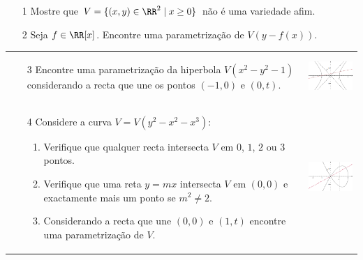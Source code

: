 
\usepackage{hyperref}
\usepackage{graphicx}
\newcommand{\real}[1]{\underline{\mathbf{#1}}} 
\newcommand{\mod}{\mathrm{mod}\:}




\nextsect

\begin{enumerate}
\item[1] Mostre que $V=\{(x,y)\in \RR^2 \mid x \geq 0\}$ não é uma variedade afim.
\item[2] Seja $f\in \RR[x]$. Encontre uma parametrização de $V(y-f(x))$.
\end{enumerate}
\begin{tabular}{lr}
 \begin{minipage}{0.7\textwidth}
  \begin{enumerate}
    \item[3] Encontre uma parametrização da hiperbola $V(x^2-y^2-1)$ considerando a recta que une os pontos $(-1,0)$ e $(0,t)$. 
  \end{enumerate}
\vspace{4cm}
 \end{minipage}
&\includegraphics[width=4cm]{hiperbola.jpg}\\
\begin{minipage}{0.7\textwidth}
 \begin{enumerate}
  \item[4] Considere a curva $V=V(y^2-x^2-x^3)$:
  \begin{enumerate}
	\item Verifique que qualquer recta intersecta $V$ em $0$, $1$, $2$ ou $3$ pontos.
	\item Verifique que uma reta $y=mx$ intersecta $V$ em $(0,0)$ e exactamente mais um ponto se $m^2\neq 2$.
	\item Considerando a recta que une $(0,0)$ e $(1,t)$ encontre uma parametrização de $V$.
  \end{enumerate}
 \end{enumerate}\vspace{2cm}
\end{minipage}
&\includegraphics[width=4cm]{curva.jpg}
 \end{tabular}
